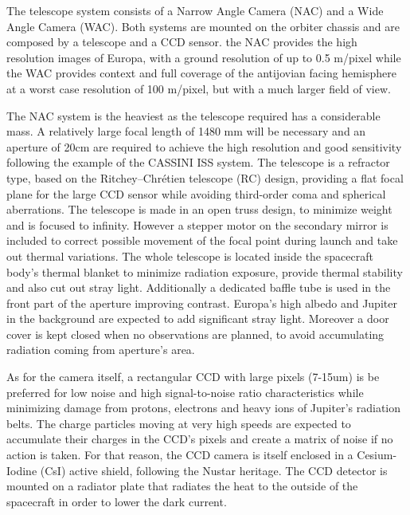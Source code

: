 The telescope system consists of a Narrow Angle Camera (NAC) and a Wide Angle Camera (WAC). Both systems are mounted on the orbiter chassis and are composed by a telescope and a CCD sensor. the NAC provides the high resolution images of Europa, with a ground resolution of up to 0.5 m/pixel while the WAC provides context and full coverage of the antijovian facing hemisphere at a worst case resolution of 100 m/pixel, but with a much larger field of view.

The NAC system is the heaviest as the telescope required has a considerable mass. A relatively large focal length of 1480 mm will be necessary and an aperture of 20cm are required to achieve the high resolution and good sensitivity following the example of the CASSINI ISS system. The telescope is a refractor type, based on the Ritchey–Chrétien telescope (RC) design, providing a flat focal plane for the large CCD sensor while avoiding third-order coma and spherical aberrations. The telescope is made in an open truss design, to minimize weight and is focused to infinity. However a stepper motor on the secondary mirror is included to correct possible movement of the focal point during launch and take out thermal variations. The whole telescope is located inside the spacecraft body's thermal blanket to minimize radiation exposure, provide thermal stability and also cut out stray light. Additionally a dedicated baffle tube is used in the front part of the aperture improving contrast. Europa's high albedo and Jupiter in the background are expected to add significant stray light. Moreover a door cover is kept closed when no observations are planned, to avoid accumulating radiation coming from aperture's area.

As for the camera itself, a rectangular CCD with large pixels (7-15um) is be preferred for low noise and high signal-to-noise ratio characteristics while minimizing damage from protons, electrons and heavy ions of Jupiter's radiation belts. The charge particles moving at very high speeds are expected to accumulate their charges in the CCD's pixels and create a matrix of noise if no action is taken. For that reason, the CCD camera is itself enclosed in a Cesium-Iodine (CsI) active shield, following the Nustar heritage. The CCD detector is mounted on a radiator plate that radiates the heat to the outside of the spacecraft in order to lower the dark current. 

